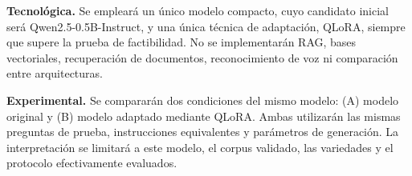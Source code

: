 \noindent\textbf{Tecnológica.} Se empleará un único modelo compacto, cuyo candidato inicial será Qwen2.5-0.5B-Instruct, y una única técnica de adaptación, QLoRA, siempre que supere la prueba de factibilidad. No se implementarán RAG, bases vectoriales, recuperación de documentos, reconocimiento de voz ni comparación entre arquitecturas.

\noindent\textbf{Experimental.} Se compararán dos condiciones del mismo modelo: (A) modelo original y (B) modelo adaptado mediante QLoRA. Ambas utilizarán las mismas preguntas de prueba, instrucciones equivalentes y parámetros de generación. La interpretación se limitará a este modelo, el corpus validado, las variedades y el protocolo efectivamente evaluados.
